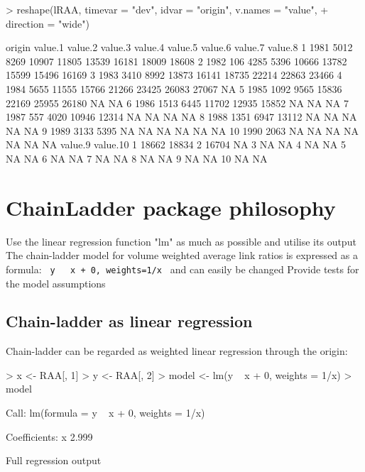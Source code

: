 \documentclass[a4paper]{article}
\begin{document}
\begin{Schunk}
\begin{Sinput}
> reshape(lRAA, timevar = "dev", idvar = "origin", v.names = "value", 
+     direction = "wide")
\end{Sinput}
\begin{Soutput}
   origin value.1 value.2 value.3 value.4 value.5 value.6 value.7 value.8
1    1981    5012    8269   10907   11805   13539   16181   18009   18608
2    1982     106    4285    5396   10666   13782   15599   15496   16169
3    1983    3410    8992   13873   16141   18735   22214   22863   23466
4    1984    5655   11555   15766   21266   23425   26083   27067      NA
5    1985    1092    9565   15836   22169   25955   26180      NA      NA
6    1986    1513    6445   11702   12935   15852      NA      NA      NA
7    1987     557    4020   10946   12314      NA      NA      NA      NA
8    1988    1351    6947   13112      NA      NA      NA      NA      NA
9    1989    3133    5395      NA      NA      NA      NA      NA      NA
10   1990    2063      NA      NA      NA      NA      NA      NA      NA
   value.9 value.10
1    18662    18834
2    16704       NA
3       NA       NA
4       NA       NA
5       NA       NA
6       NA       NA
7       NA       NA
8       NA       NA
9       NA       NA
10      NA       NA
\end{Soutput}
\end{Schunk}

\section{ChainLadder package philosophy}
Use the linear regression function "lm" as
much as possible and utilise its output
 The chain-ladder model for volume weighted
average link ratios is expressed as a formula:
\texttt{ y ~ x + 0, weights=1/x }
and can easily be changed
 Provide tests for the model assumptions

\subsection{Chain-ladder as linear regression }
Chain-ladder can be regarded as weighted linear
regression through the origin:
\begin{Schunk}
\begin{Sinput}
> x <- RAA[, 1]
> y <- RAA[, 2]
> model <- lm(y ~ x + 0, weights = 1/x)
> model
\end{Sinput}
\begin{Soutput}
Call:
lm(formula = y ~ x + 0, weights = 1/x)

Coefficients:
    x  
2.999  
\end{Soutput}
\end{Schunk}
Full regression output
\end{document}

